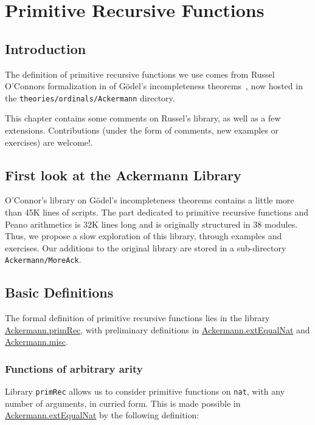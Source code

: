 \chapter{Primitive Recursive Functions}

\section{Introduction}
The definition of primitive recursive functions we use comes
from Russel O'Connors formalization in \coq{} of
G\"odel's incompleteness theorems~\cite{OConnor05}, now hosted in
the \texttt{theories/ordinals/Ackermann} directory.

This chapter contains some comments on Russel's library, as well as a few extensions.
Contributions (under the form of comments, new examples or exercises) are welcome!. 

\section{First look at the Ackermann Library}

O'Connor's library on Gödel's incompleteness theorems contains a little more 
than 45K lines of scripts. The part dedicated to primitive recursive functions and Peano arithmetics is 32K lines long and is originally structured in 38 modules.
Thus, we propose a slow exploration of this library, through examples and exercises. Our additions to the original library 
are stored in a sub-directory \texttt{Ackermann/MoreAck}.

\section{Basic Definitions}

The formal definition of primitive recursive functions lies in the library
\href{../theories/html/hydras.Ackermann.primRec.html}{Ackermann.primRec},
with preliminary definitions in 
\href{../theories/html/hydras.Ackermann.extEqualNat.html}{Ackermann.extEqualNat}
and
\href{../theories/html/hydras.Ackermann.misc.html}{Ackermann.misc}.

\subsection{Functions of arbitrary arity}

Library \texttt{primRec} allows us to consider primitive functions on \texttt{nat}, with any number of arguments, in 
curried form. This is made possible in 
\href{../theories/html/hydras.Ackermann.extEqualNat.html}{Ackermann.extEqualNat} by the following definition:


